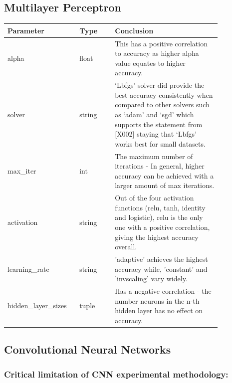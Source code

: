 \documentclass[11pt]{article}
\begin{document}
\newpage
\subsection{Multilayer Perceptron}

\begin{table}[ht]
  \centering
  \begin{tabular}{|p{0.25\linewidth} | p{0.15 \linewidth} | p{0.45\linewidth}|} 
    \hline
    \textbf{Parameter} & \textbf{Type} & \textbf{Conclusion} \\ \hline
    alpha & float & This has a positive correlation to accuracy as higher alpha value equates to higher accuracy. \\ \hline 
    solver & string & ‘Lbfgs’ solver did provide the best accuracy consistently when compared to other solvers such as ‘adam’ and ‘sgd’ which supports the statement from [X002] staying that ‘Lbfgs’ works best for small datasets. \\ \hline
    max\_iter & int & The maximum number of iterations - In general, higher accuracy can be achieved with a larger amount of max iterations. \\ \hline
    activation & string & Out of the four activation functions (relu, tanh, identity and logistic), relu is the only one with a positive correlation, giving the highest accuracy overall. \\ \hline  
    learning\_rate & string & 'adaptive' achieves the highest accuracy while, 'constant' and 'invscaling' vary widely. \\ \hline  
    hidden\_layer\_sizes & tuple & Has a negative correlation - the number neurons in the n-th hidden layer has no effect on accuracy. \\ \hline
  \end{tabular}
\end{table}\label{MLP_Analysis_Table}

\newpage
\subsection{Convolutional Neural Networks}
\subsubsection{Critical limitation of CNN experimental methodology:}
\end{document}
